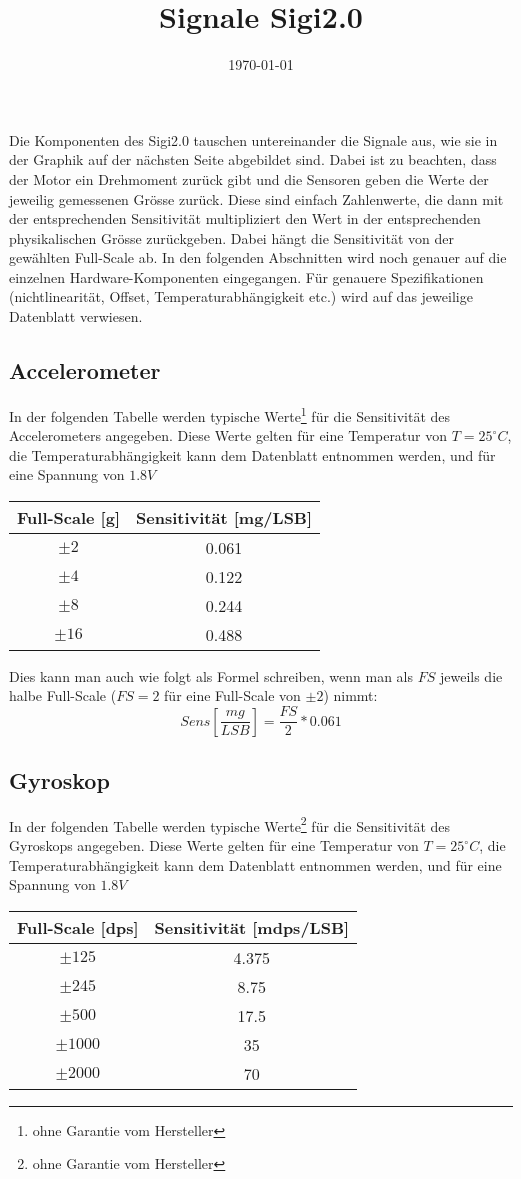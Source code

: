 \documentclass[a4paper, 12pt]{article}
\title{Signale Sigi2.0}
\date{\today}
\begin{document}
\maketitle

Die Komponenten des Sigi2.0 tauschen untereinander die Signale aus, wie sie in der Graphik auf der nächsten Seite abgebildet sind. Dabei ist zu beachten, dass der Motor ein Drehmoment zurück gibt und die Sensoren geben die Werte der jeweilig gemessenen Grösse zurück. Diese sind einfach Zahlenwerte, die dann mit der entsprechenden Sensitivität multipliziert den Wert in der entsprechenden physikalischen Grösse zurückgeben. Dabei hängt die Sensitivität von der gewählten Full-Scale ab. In den folgenden Abschnitten wird noch genauer auf die einzelnen Hardware-Komponenten eingegangen. Für genauere Spezifikationen (nichtlinearität, Offset, Temperaturabhängigkeit etc.) wird auf das jeweilige Datenblatt verwiesen.

\subsection*{Accelerometer}
In der folgenden Tabelle werden typische Werte\footnote{ohne Garantie vom Hersteller} für die Sensitivität des Accelerometers angegeben.
Diese Werte gelten für eine Temperatur von $T = 25^\circ C$, die Temperaturabhängigkeit kann dem Datenblatt entnommen werden, und für eine Spannung von $1.8 V$
\begin{center}
	\begin{tabular}{c | c}
	Full-Scale [g] & Sensitivität [mg/LSB]\\\hline
	$\pm 2$ & 0.061\\
	$\pm 4$ & 0.122\\
	$\pm 8$ & 0.244\\
	$\pm 16$ & 0.488
\end{tabular}
\end{center}
Dies kann man auch wie folgt als Formel schreiben, wenn man als $FS$ jeweils die halbe Full-Scale ($FS = 2$ für eine Full-Scale von $\pm 2$) nimmt:\\
\[Sens \left[\frac{mg}{LSB}\right] = \frac{FS}{2}*0.061\]

\subsection*{Gyroskop}
In der folgenden Tabelle werden typische Werte\footnote{ohne Garantie vom Hersteller} für die Sensitivität des Gyroskops angegeben.
Diese Werte gelten für eine Temperatur von $T = 25^\circ C$, die Temperaturabhängigkeit kann dem Datenblatt entnommen werden, und für eine Spannung von $1.8 V$
\begin{center}
	\begin{tabular}{c | c}
	Full-Scale [dps] & Sensitivität [mdps/LSB]\\\hline
	$\pm 125$ & 4.375\\
	$\pm 245$ & 8.75\\
	$\pm 500$ & 17.5\\
	$\pm 1000$ & 35\\
	$\pm 2000$ & 70
\end{tabular}
\end{center}
\end{document}
